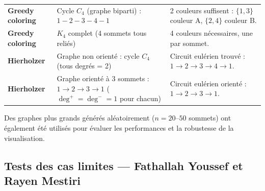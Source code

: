 \documentclass[a4paper,12pt]{report}
\begin{document}
\begin{longtable}{>{\bfseries}p{3.2cm} p{4.8cm} p{5.2cm}}
\rowcolor{teal100}
Greedy coloring &
Cycle $C_4$ (graphe biparti) : $1-2-3-4-1$ &
2 couleurs suffisent : $\{1,3\}$ couleur A, $\{2,4\}$ couleur B. \\

Greedy coloring &
$K_4$ complet (4 sommets tous reliés) &
4 couleurs nécessaires, une par sommet. \\

\rowcolor{teal100}
Hierholzer &
Graphe non orienté : cycle $C_4$ (tous degrés = 2) &
Circuit eulérien trouvé : $1\to2\to3\to4\to1$. \\

Hierholzer &
Graphe orienté à 3 sommets : $1\to2\to3\to1$ ($\deg^+=\deg^-=1$ pour chacun) &
Circuit eulérien orienté : $1\to2\to3\to1$. \\

\end{longtable}

Des graphes plus grands générés aléatoirement ($n = 20$--$50$ sommets) ont également
été utilisés pour évaluer les performances et la robustesse de la visualisation.
 
\subsection{Tests des cas limites — Fathallah Youssef et Rayen Mestiri}
 
\end{document}
